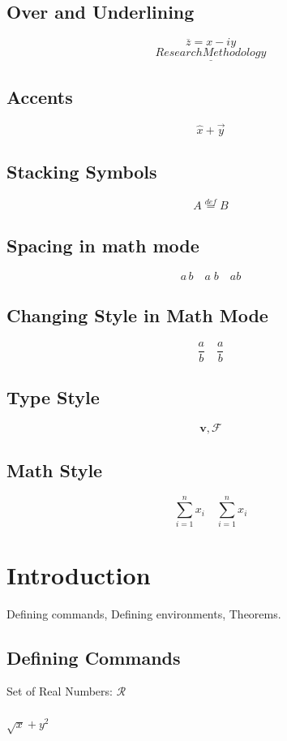 \documentclass{article}
\newcommand{\sq}[1]{#1^2}
\begin{document}
\subsection{Over and Underlining}
\[
\overline{z}=x-iy
\]
\[
\underline{Research Methodology}
\]

\subsection{Accents}
\[
\hat{x} + \vec{y}
\]

\subsection{Stacking Symbols}
\[
A \stackrel{def}{=} B
\]

\subsection{Spacing in math mode}
\[
a\,b \quad a\;b \quad a\!b
\]

\subsection{Changing Style in Math Mode}
\[
{\displaystyle \frac{a}{b}} \quad {\textstyle \frac{a}{b}}
\]

\subsection{Type Style}
\[
\mathbf{v}, \mathcal{F}
\]

\subsection{Math Style}
\[
\sum_{i=1}^{n} x_i \quad 
{\scriptstyle \sum_{i=1}^{n} x_i}
\]
\section{Introduction}
Defining commands, Defining environments, Theorems.

\subsection{Defining Commands}
Set of Real Numbers: $\mathcal{R}$
\\ \\
$\sqrt{x} + \sq{y}$
\end{document}
